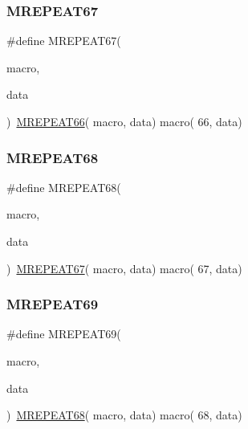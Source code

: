 \mbox{\label{group__group__sam0__utils__mrepeat_ga4cb1fbebc5e11842a5e69ce245997668}} 
\subsubsection{\texorpdfstring{MREPEAT67}{MREPEAT67}}
{\footnotesize\ttfamily \#define M\+R\+E\+P\+E\+A\+T67(\begin{DoxyParamCaption}\item[{}]{macro,  }\item[{}]{data }\end{DoxyParamCaption})~\mbox{\hyperlink{group__group__sam0__utils__mrepeat_ga900ae85fc32323d04086e2dd4ce7a275}{M\+R\+E\+P\+E\+A\+T66}}( macro, data)   macro( 66, data)}

\mbox{\label{group__group__sam0__utils__mrepeat_ga1f925f41c5c5e044e274c24fd24f3416}} 
\subsubsection{\texorpdfstring{MREPEAT68}{MREPEAT68}}
{\footnotesize\ttfamily \#define M\+R\+E\+P\+E\+A\+T68(\begin{DoxyParamCaption}\item[{}]{macro,  }\item[{}]{data }\end{DoxyParamCaption})~\mbox{\hyperlink{group__group__sam0__utils__mrepeat_ga4cb1fbebc5e11842a5e69ce245997668}{M\+R\+E\+P\+E\+A\+T67}}( macro, data)   macro( 67, data)}

\mbox{\label{group__group__sam0__utils__mrepeat_gaf5b5c7b140c272560551ca6b6b37256c}} 
\subsubsection{\texorpdfstring{MREPEAT69}{MREPEAT69}}
{\footnotesize\ttfamily \#define M\+R\+E\+P\+E\+A\+T69(\begin{DoxyParamCaption}\item[{}]{macro,  }\item[{}]{data }\end{DoxyParamCaption})~\mbox{\hyperlink{group__group__sam0__utils__mrepeat_ga1f925f41c5c5e044e274c24fd24f3416}{M\+R\+E\+P\+E\+A\+T68}}( macro, data)   macro( 68, data)}

